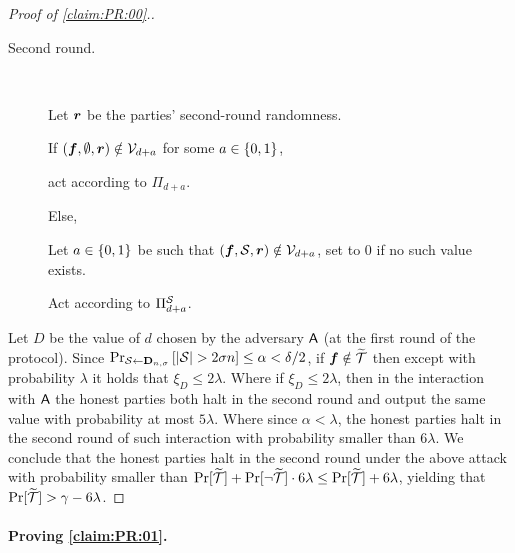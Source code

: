 \begin{proof}[Proof of \cref{claim:PR:00}.]
{\begin{algorithm}[$\Ac$]
\begin{description}
		\item[Second round.]~
		
		Let ${ \boldsymbol{r}}$ be the parties' second-round randomness.
		
		
		If $({ \boldsymbol{f}},\emptyset,{ \boldsymbol{r}}) \notin \mathcal{V}_{d+a}$ for some $a\in \{0,1\}$,
		
		\quad act according to $\Pi_{d+a}$.
		
		Else,
		
		\quad Let $a\in \{0,1\}$ be such that $({ \boldsymbol{f}},{\cal{S}},{ \boldsymbol{r}}) \notin \mathcal{V}_{d+a}$, set to $0$ if no such value exists.
		
		\quad Act according to $\Pi^{{\cal{S}}}_{d+a}$.
			
	
\end{description}			
	\end{algorithm}
}

Let $D$ be the value of $d$ chosen by the adversary $\Ac$ (at the first round of the protocol).
Since $\Pr_{{\cal{S}} \gets \mathbf{D}_{n,\sigma}}\left[ \left|{\cal{S}}\right| > 2\sigma n\right] \le \alpha < \delta/2$,
if ${ \boldsymbol{f}} \notin {\widetilde{\mathcal{T}}}$ then except with probability $\lambda$ it holds that $\xi_D \le 2\lambda$. Where if $\xi_D \le 2\lambda$, then in the interaction with $\Ac$ the honest parties both halt in the second round and output the same value with probability at most $5\lambda$. Where since $\alpha < \lambda$, the honest parties halt in the second round of such interaction with probability smaller than $6\lambda$. We conclude that the honest parties halt in the second round under the above attack with probability smaller than $\Pr[{\widetilde{\mathcal{T}}}] + \Pr[\neg {\widetilde{\mathcal{T}}}]\cdot 6\lambda \le \Pr[{\widetilde{\mathcal{T}}}] + 6\lambda$, yielding that $\Pr[{\widetilde{\mathcal{T}}}] > \gamma- 6\lambda$.
\end{proof}




\paragraph{Proving \cref{claim:PR:01}.}


\newcommand{\oH}{{\overline{\cH}}}

